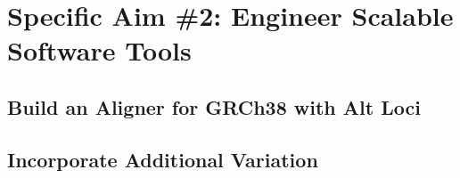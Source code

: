 \documentclass[11pt,proposal]{ucthesis}
\begin{document}
    
        
        
        
        
        
    
    
        
        
        
        
    
    
        
        
\section{Specific Aim \#2: Engineer Scalable Software Tools}
\label{sec:aim2}

\subsection{Build an Aligner for GRCh38 with Alt Loci}

\subsection{Incorporate Additional Variation}
\end{document}
